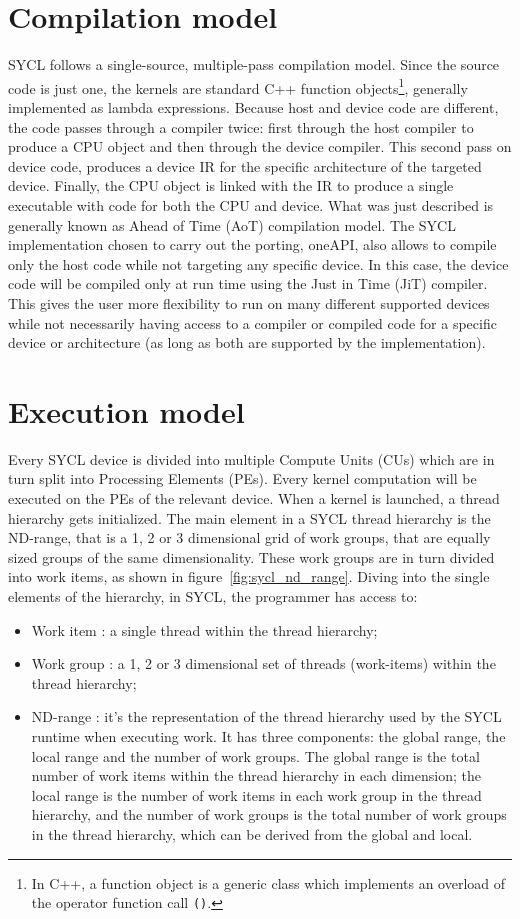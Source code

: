 \section{Compilation model}
\label{ch:compilation_model}
SYCL follows a single-source, multiple-pass compilation model. Since the source code is just one, the kernels are standard C++ function objects\footnote{In C++, a function object is a generic class which implements an overload of the operator function call \Verb "()".}, generally implemented as lambda expressions. Because host and device code are different, the code passes through a compiler twice: first through the host compiler to produce a CPU object and then through the device compiler. This second pass on device code, produces a device IR for the specific architecture of the targeted device. Finally, the CPU object is linked with the IR to produce a single executable with code for both the CPU and device. What was just described is generally known as Ahead of Time (AoT) compilation model. The SYCL implementation chosen to carry out the porting, oneAPI, also allows to compile only the host code while not targeting any specific device. In this case, the device code will be compiled only at run time using the Just in Time (JiT) compiler. This gives the user more flexibility to run on many different supported devices while not necessarily having access to a compiler or compiled code for a specific device or architecture (as long as both are supported by the implementation).

\section{Execution model}
\label{ch:execution_model}
Every SYCL device is divided into multiple Compute Units (CUs) which are in turn split into Processing Elements (PEs). Every kernel computation will be executed on the PEs of the relevant device. When a kernel is launched, a thread hierarchy gets initialized. The main element in a SYCL thread hierarchy is the ND-range, that is a 1, 2 or 3 dimensional grid of work groups, that are equally sized groups of the same dimensionality. These work groups are in turn divided into work items, as shown in figure~\ref{fig:sycl_nd_range}. Diving into the single elements of the hierarchy, in SYCL, the programmer has access to:
\begin{itemize}
    \item Work item : a single thread within the thread hierarchy;
    \item Work group : a 1, 2 or 3 dimensional set of threads (work-items) within the thread hierarchy;
    \item ND-range : it's the representation of the thread hierarchy used by the SYCL runtime when executing work. It has three components: the global range, the local range and the number of work groups. The global range is the total number of work items within the thread hierarchy in each dimension; the local range is the number of work items in each work group in the thread hierarchy, and the number of work groups is the total number of work groups in the thread hierarchy, which can be derived from the global and local.
\end{itemize}


